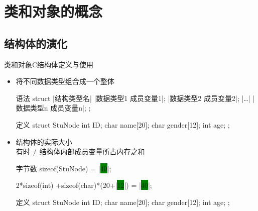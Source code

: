 \section[概念]{类和对象的概念}\label{sec:chap03-sec01}
\subsection[结构体]{结构体的演化}
\begin{frame}[fragile]{类和对象}{C结构体定义与使用}%
  \begin{itemize}
  \item 将不同数据类型组合成一个整体\\
    \begin{center}
      \begin{minipage}{0.45\linewidth}
        \begin{cpptcb}[||]{语法}
struct |结构类型名|
{
    |数据类型1 成员变量1|;
    |数据类型2 成员变量2|;
    |…|
    |数据类型n 成员变量n|;
};
        \end{cpptcb}
      \end{minipage}\qquad
      \begin{minipage}{0.38\linewidth}
        \begin{cpptcb}{定义}
struct StuNode{
    int ID;
    char name[20];
    char gender[12];
    int age;
};
        \end{cpptcb}
      \end{minipage}
    \end{center} 
  \item 结构体的实际大小\\
    {\tiny 有时$\neq$结构体内部成员变量所占内存之和}\\
    \begin{center}
      \begin{minipage}{0.45\linewidth}%
        \begin{cpptcb}[||]{字节数}
sizeof(StuNode) = |\colorbox{green}{40}|;

2*sizeof(int)
+sizeof(char)*(20+|\colorbox{green}{12}|)
= |\colorbox{green}{40}|;
        \end{cpptcb}
      \end{minipage}\qquad
      \begin{minipage}{0.38\linewidth}
        \begin{cpptcb}{定义}
struct StuNode{
    int ID;
    char name[20];
    char gender[12];
    int age;
};
        \end{cpptcb}
      \end{minipage}
    \end{center}
  \end{itemize}
\end{frame}

